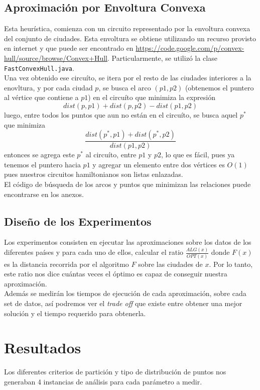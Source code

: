 \documentclass[12pt,letterpaper, margin = 3cm]{article}
\begin{document}
\subsection{Aproximación por Envoltura Convexa}

Esta heurística, comienza con un circuito representado por la envoltura convexa del conjunto de ciudades. Esta envoltura se obtiene utilizando un recurso provisto en internet y que puede ser encontrado en \url{https://code.google.com/p/convex-hull/source/browse/Convex+Hull}. Particularmente, se utilizó la clase \verb+FastConvexHull.java+.\\
Una vez obtenido ese circuíto, se itera por el resto de las ciudades interiores a la enovltura, y por cada ciudad $p$, se busca el arco $(p1,p2)$ (obtenemos el puntero al vértice que contiene a $p1$) en el circuíto que minimiza la expresión \[ dist(p,p1)+dist(p,p2)-dist(p1,p2) \] luego, entre todos los puntos que aun no están en el circuíto, se busca aquel $p^*$ que minimiza \[ \frac{dist(p^*,p1)+dist(p^*,p2)}{dist(p1,p2)} \] entonces se agrega este $p^*$ al circuíto, entre $p1$ y $p2$, lo que es fácil, pues ya tenemos el puntero hacia $p1$ y agregar un elemento entre dos vértices es $O(1)$ pues nuestros circuitos hamiltonianos son listas enlazadas.\\
El código de búsqueda de los arcos y puntos que minimizan las relaciones puede encontrarse en los anexos.


\subsection{Diseño de los Experimentos}
Los experimentos consisten en ejecutar las aproximaciones sobre los datos de los diferentes países y para cada uno de ellos, calcular el ratio $\frac{ALG(x)}{OPT(x)}$ donde $F(x)$ es la distancia recorrida por el algoritmo $F$ sobre las ciudades de $x$. Por lo tanto, este ratio nos dice cuántas veces el óptimo es capaz de conseguir nuestra aproximación.\\
Además se medirán los tiempos de ejecución de cada aproximación, sobre cada set de datos, así podremos ver el \textit{trade off} que existe entre obtener una mejor solución y el tiempo requerido para obtenerla.

\newpage
\section{Resultados}
Los diferentes criterios de partición y tipo de distribución de puntos nos generaban 4 instancias de análisis para cada parámetro a medir.
\end{document}
